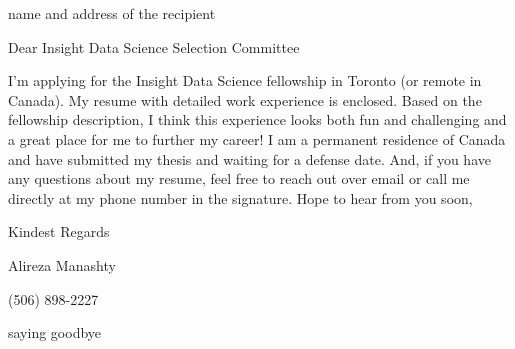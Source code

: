 \documentclass[10pt,letterpaper]{letter}
\begin{document}
 
\begin{letter}{name and address of the recipient} 
\opening{Dear Insight Data Science Selection Committee} 
 
I'm applying for the Insight Data Science fellowship in Toronto (or remote in Canada).
My resume with detailed work experience is enclosed. Based on the fellowship description, I think this experience looks both fun and challenging and a great place for me to further my career! I am a permanent residence of Canada and have submitted my thesis and waiting for a defense date.
And, if you have any questions about my resume, feel free to reach out over email or call me directly at my phone number in the signature.
Hope to hear from you soon,

Kindest Regards

Alireza Manashty

(506) 898-2227

\closing{saying goodbye} 
\end{letter} 
\end{document}
